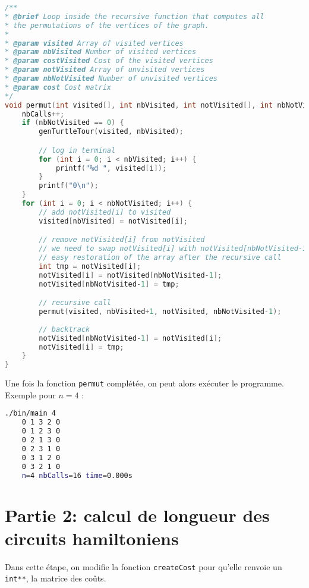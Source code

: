 \begin{lstlisting}[language=c, caption={Implémentation de l'algorithme \texttt{permut}}]
/**
* @brief Loop inside the recursive function that computes all 
* the permutations of the vertices of the graph.
* 
* @param visited Array of visited vertices
* @param nbVisited Number of visited vertices
* @param costVisited Cost of the visited vertices
* @param notVisited Array of unvisited vertices
* @param nbNotVisited Number of unvisited vertices
* @param cost Cost matrix
*/
void permut(int visited[], int nbVisited, int notVisited[], int nbNotVisited) {
    nbCalls++;
    if (nbNotVisited == 0) {
        genTurtleTour(visited, nbVisited);

        // log in terminal
        for (int i = 0; i < nbVisited; i++) {
            printf("%d ", visited[i]);
        }
        printf("0\n");
    }
    for (int i = 0; i < nbNotVisited; i++) {
        // add notVisited[i] to visited
        visited[nbVisited] = notVisited[i];

        // remove notVisited[i] from notVisited
        // we need to swap notVisited[i] with notVisited[nbNotVisited-1] for 
        // easy restoration of the array after the recursive call
        int tmp = notVisited[i];
        notVisited[i] = notVisited[nbNotVisited-1];
        notVisited[nbNotVisited-1] = tmp;

        // recursive call
        permut(visited, nbVisited+1, notVisited, nbNotVisited-1);
    
        // backtrack
        notVisited[nbNotVisited-1] = notVisited[i];
        notVisited[i] = tmp;
    }
}
\end{lstlisting}

Une fois la fonction \texttt{permut} complétée, on peut alors exécuter le programme. Exemple pour $n = 4$ :

\begin{lstlisting}[language=bash, caption={Exécution de l'algorithme \texttt{permut} pour $n = 4$}]
    ./bin/main 4
    0 1 3 2 0
    0 1 2 3 0
    0 2 1 3 0
    0 2 3 1 0
    0 3 1 2 0
    0 3 2 1 0
    n=4 nbCalls=16 time=0.000s
\end{lstlisting}

\section{Partie 2: calcul de longueur des circuits hamiltoniens}

Dans cette étape, on modifie la fonction \texttt{createCost} pour qu'elle renvoie un \texttt{int**}, la matrice des coûts.

